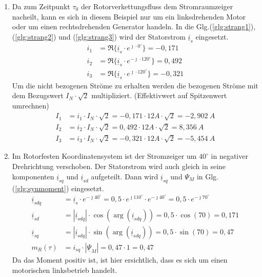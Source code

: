 \begin{solution}
\begin{enumerate}
\item  Da zum Zeitpunkt $\tau_0$ der Rotorverkettungsfluss dem Stromraumzeiger nacheilt, kann es sich in diesem Beispiel nur um ein linksdrehenden Motor oder um einen rechtsdrehenden Generator handeln. 
In die Glg.(\ref{glg:strang1}),(\ref{glg:strang2}) und (\ref{glg:strang3}) wird der Statorstrom $\underline{i}_s$ eingesetzt.
\begin{align}
i_1 & = \Re \{ \underline{i}_s \cdot e^{\jmath \cdot 0 ^\circ} \} = -0,171\\
i_2 & = \Re \{ \underline{i}_s \cdot e^{-\jmath \cdot 120 ^\circ} \} = 0,492 \\
i_3 & = \Re \{ \underline{i}_s \cdot e^{\jmath \cdot 120 ^\circ} \}=  -0,321
\end{align}
Um die nicht bezogenen Ströme zu erhalten werden die bezogenen Ströme mit dem Bezugswert $I_N \cdot \sqrt{2}$ multipliziert. (Effektivwert auf Spitzenwert umrechnen)
\begin{align}
I_1 & = i_1 \cdot I_N \cdot \sqrt{2} = -0,171 \cdot 12 A \cdot \sqrt{2} =-2,902~A \\
I_2 & = i_2 \cdot I_N \cdot \sqrt{2} = 0,492 \cdot 12 A \cdot \sqrt{2} =8,356~A \\
I_3 & = i_3 \cdot I_N \cdot \sqrt{2} =-0,321 \cdot 12 A \cdot \sqrt{2} =-5,454~A
\end{align}
\item Im Rotorfesten Koordinatensystem ist der Stromzeiger um $40^\circ$ in negativer Drehrichtung verschoben. Der Statorstrom wird auch gleich in seine komponenten $\underline{i}_{sq}$ und $\underline{i}_{sd}$ aufgeteilt. Dann wird $\underline{i}_{sq}$ und $\Psi_M$ in Glg.(\ref{glg:synmoment}) eingesetzt.
\begin{align}
\underline{i}_{sdq} & = \underline{i}_s \cdot e^{-\jmath 40 ^\circ} = 0,5 \cdot e^{\jmath 110 ^\circ} \cdot e^{-\jmath 40 ^\circ} = 0,5 \cdot e^{-\jmath 70 ^\circ} \\
\underline{i}_{sd} & = |\underline{i}_{sdq}| \cdot \cos(\arg(\underline{i}_{sdq})) = 0,5 \cdot \cos(70) = 0,171 \\
\underline{i}_{sq} & = |\underline{i}_{sdq}| \cdot \sin(\arg(\underline{i}_{sdq})) = 0,5 \cdot \sin(70) = 0,47 \\
m_R(\tau)& =  i_{sq} \cdot | \underline{\Psi}_M|= 0,47\cdot 1 = 0,47
\end{align}
Da das Moment positiv ist, ist hier ersichtlich, dass es sich um einen motorischen linksbetrieb handelt.

\end{enumerate}
\end{solution}
